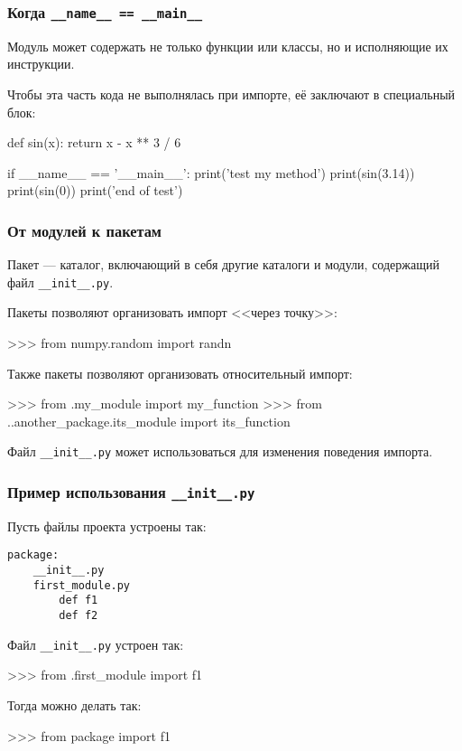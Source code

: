 \documentclass[fleqn, xcolor=x11names, 11pt]{beamer}
\begin{document}
\begin{frame}[fragile]\frametitle{Когда \texttt{\_\_name\_\_ == \_\_main\_\_}}

Модуль может содержать не только функции или классы, но и исполняющие их инструкции.

Чтобы эта часть кода не выполнялась при импорте, её заключают в специальный блок:

\begin{pcode}
def sin(x):
    return x - x ** 3 / 6

if __name__ == '__main__':
    print('test my method')
    print(sin(3.14))
    print(sin(0))
    print('end of test')
\end{pcode}

\end{frame}

\begin{frame}[fragile]\frametitle{От модулей к пакетам}
Пакет --- каталог, включающий в себя другие каталоги и модули, содержащий файл \texttt{\_\_init\_\_.py}.
	
\hfill
	
Пакеты позволяют организовать импорт <<через точку>>:

\begin{pcode}
>>> from numpy.random import randn
\end{pcode}
	
\hfill
		
Также пакеты позволяют организовать относительный импорт:
\begin{pcode}
>>> from .my_module import my_function
>>> from ..another_package.its_module import its_function
\end{pcode}

\hfill

Файл \texttt{\_\_init\_\_.py} может использоваться для изменения поведения импорта.
\end{frame}

\begin{frame}[fragile]\frametitle{Пример использования \texttt{\_\_init\_\_.py}}
Пусть файлы проекта устроены так:
\begin{verbatim}
package:
    __init__.py
    first_module.py
        def f1
        def f2
\end{verbatim}

\hfill

Файл \texttt{\_\_init\_\_.py} устроен так:
\begin{pcode}
>>> from .first_module import f1
\end{pcode}

\hfill

Тогда можно делать так:
\begin{pcode}
>>> from package import f1
\end{pcode}

\end{frame}
\end{document}
